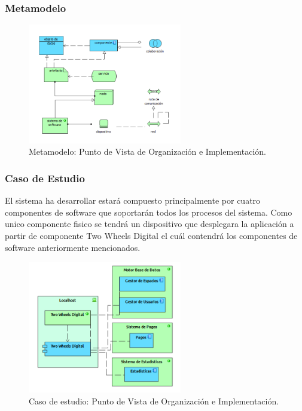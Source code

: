 \subsubsection{Metamodelo}
\begin{figure}[h]
	\centering
	\includegraphics[width=0.6\textwidth]{imagenes/Metamodelos/Tecnologia/meta_organizacion_implementacion.PDF}
	\caption{Metamodelo: Punto de Vista de Organización e Implementación.}
	\label{fig:gap_analysis}
\end{figure}

\subsubsection{Caso de Estudio}
El sistema ha desarrollar estará compuesto principalmente por cuatro componentes de software que soportarán todos los procesos del sistema. Como unico componente fisico se tendrá un dispositivo que desplegara la aplicación a partir de componente Two Wheels Digital el cuál contendrá los componentes de software anteriormente mencionados.

\begin{figure}[h]
	\centering
	\includegraphics[width=0.6\textwidth]{imagenes/Caso_Estudio/Tecnologia/organizacion_implementacion.PDF}
	\caption{Caso de estudio: Punto de Vista de Organización e Implementación.}
	\label{fig:gap_analysis}
\end{figure}


